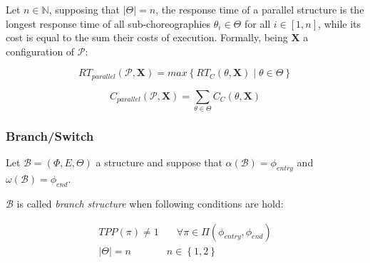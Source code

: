 \documentclass[10pt,a4paper]{report}
\newcommand*{\N}{\mathbb{N}}
\theoremstyle{definition}
\begin{document}
Let $n \in \N$, supposing that $|\Theta| = n$, the response time of a parallel structure is the longest response time of all sub-choreographies $\theta_i \in \Theta$ for all $i \in \left[ 1, n \right]$, while its cost is equal to the sum their costs of execution. Formally, being $\textbf{X}$ a configuration of  $\mathcal{P}$:

\begin{equation}
	RT_{parallel}(\mathcal{P}, \textbf{X}) = max \left\lbrace RT_C(\mathcal{\theta}, \textbf{X}) \mid \theta \in \Theta \right\rbrace 
\end{equation}

\begin{equation}
	C_{parallel}(\mathcal{P}, \textbf{X}) = \sum_{\theta \in \Theta} C_C(\theta, \textbf{X})
\end{equation}



\subsubsection{Branch/Switch}

Let $\mathcal{B} = (\Phi,E,\Theta)$ a structure and suppose that $\alpha(\mathcal{B}) = \phi_{entry}$ and $\omega(\mathcal{B}) = \phi_{end}$. 

$\mathcal{B}$ is called \textit{branch structure} when following conditions are hold:

\begin{eqnarray}
	TPP(\pi) \neq 1  & \quad \forall \pi \in \Pi(\phi_{entry}, \phi_{end}) \\
	|\Theta| = n  & n \in \left\lbrace 1,2 \right\rbrace 
\end{eqnarray}
\end{document}
